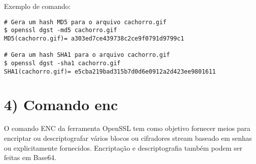 \documentclass[a4paper,11pt]{article}
\theoremstyle{mytheor}
\begin{document}
\noindent Exemplo de comando:
\begin{lstlisting}
# Gera um hash MD5 para o arquivo cachorro.gif
$ openssl dgst -md5 cachorro.gif
MD5(cachorro.gif)= a303ed7ce439738c2ce9f0791d9799c1

# Gera um hash SHA1 para o arquivo cachorro.gif
$ openssl dgst -sha1 cachorro.gif
SHA1(cachorro.gif)= e5cba219bad315b7d0d6e0912a2d423ee9801611
\end{lstlisting}

\section*{4) Comando enc}

O comando ENC da ferramenta OpenSSL tem como objetivo fornecer meios para encriptar ou descriptografar vários blocos ou cifradores stream baseado em senhas ou explicitamente fornecidos. Encriptação e descriptografia também podem ser feitas em Base64.
\end{document}
